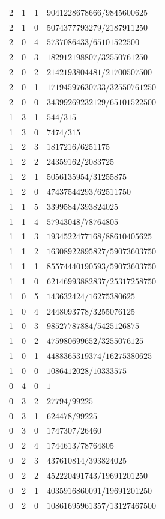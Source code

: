 \begin{longtable}{rrrl}
2 & 1 & 1 & $9041228678666/9845600625$\\
2 & 1 & 0 & $5074377793279/2187911250$\\
2 & 0 & 4 & $5737086433/65101522500$\\
2 & 0 & 3 & $182912198807/32550761250$\\
2 & 0 & 2 & $2142193804481/21700507500$\\
2 & 0 & 1 & $17194597630733/32550761250$\\
2 & 0 & 0 & $34399269232129/65101522500$\\
1 & 3 & 1 & $544/315$\\
1 & 3 & 0 & $7474/315$\\
1 & 2 & 3 & $1817216/6251175$\\
1 & 2 & 2 & $24359162/2083725$\\
1 & 2 & 1 & $5056135954/31255875$\\
1 & 2 & 0 & $47437544293/62511750$\\
1 & 1 & 5 & $3399584/393824025$\\
1 & 1 & 4 & $57943048/78764805$\\
1 & 1 & 3 & $1934522477168/88610405625$\\
1 & 1 & 2 & $16308922895827/59073603750$\\
1 & 1 & 1 & $85574440190593/59073603750$\\
1 & 1 & 0 & $62146993882837/25317258750$\\
1 & 0 & 5 & $143632424/16275380625$\\
1 & 0 & 4 & $2448093778/3255076125$\\
1 & 0 & 3 & $98527787884/5425126875$\\
1 & 0 & 2 & $475980699652/3255076125$\\
1 & 0 & 1 & $4488365319374/16275380625$\\
1 & 0 & 0 & $1086412028/10333575$\\
0 & 4 & 0 & $1$\\
0 & 3 & 2 & $27794/99225$\\
0 & 3 & 1 & $624478/99225$\\
0 & 3 & 0 & $1747307/26460$\\
0 & 2 & 4 & $1744613/78764805$\\
0 & 2 & 3 & $437610814/393824025$\\
0 & 2 & 2 & $452220491743/19691201250$\\
0 & 2 & 1 & $4035916860091/19691201250$\\
0 & 2 & 0 & $10861695961357/13127467500$\\

\end{longtable}
